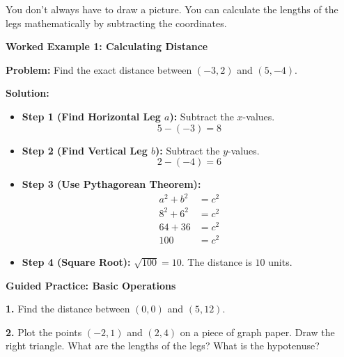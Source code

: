 \documentclass[12pt, letterpaper, fleqn]{article}
\begin{document}
\noindent
You don't always have to draw a picture. You can calculate the lengths of the legs mathematically by subtracting the coordinates.

\vspace{3mm}

\begin{tcolorbox}[colback=white, colframe=black!25, boxrule=0.6pt, arc=4mm, left=6mm, right=6mm, top=5mm, bottom=5mm]

\textbf{Worked Example 1: Calculating Distance}

\medskip

\textbf{Problem:} Find the exact distance between $(-3, 2)$ and $(5, -4)$.

\medskip

\textbf{Solution:}
\begin{itemize}
    \item \textbf{Step 1 (Find Horizontal Leg $a$):} Subtract the $x$-values. 
    \[ 5 - (-3) = 8 \]
    \item \textbf{Step 2 (Find Vertical Leg $b$):} Subtract the $y$-values.
    \[ 2 - (-4) = 6 \]
    \item \textbf{Step 3 (Use Pythagorean Theorem):}
    \begin{align*}
        a^2 + b^2 &= c^2 \\
        8^2 + 6^2 &= c^2 \\
        64 + 36 &= c^2 \\
        100 &= c^2
    \end{align*}
    \item \textbf{Step 4 (Square Root):} $\sqrt{100} = 10$. The distance is $10$ units.
\end{itemize}

\end{tcolorbox}

\vspace{4mm}

\begin{tcolorbox}[colback=white!15, colframe=black, boxrule=1.5pt, arc=4mm, left=6mm, right=6mm, top=5mm, bottom=5mm]

\textbf{Guided Practice: Basic Operations}

\medskip

\noindent
\textbf{1.} Find the distance between $(0, 0)$ and $(5, 12)$.
\vspace{2cm}

\noindent
\textbf{2.} Plot the points $(-2, 1)$ and $(2, 4)$ on a piece of graph paper. Draw the right triangle. What are the lengths of the legs? What is the hypotenuse?
\vspace{2.5cm}

\end{tcolorbox}
\end{document}
